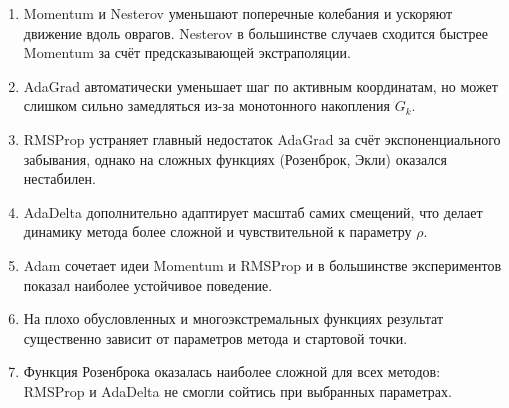 \documentclass[a4paper,12pt]{article}
\begin{document}
\begin{enumerate}

\item
Momentum и Nesterov уменьшают поперечные колебания
и ускоряют движение вдоль оврагов.
Nesterov в большинстве случаев сходится быстрее Momentum
за счёт предсказывающей экстраполяции.

\item
AdaGrad автоматически уменьшает шаг по активным координатам,
но может слишком сильно замедляться из-за монотонного
накопления $G_k$.

\item
RMSProp устраняет главный недостаток AdaGrad
за счёт экспоненциального забывания,
однако на сложных функциях (Розенброк, Экли)
оказался нестабилен.

\item
AdaDelta дополнительно адаптирует масштаб самих смещений,
что делает динамику метода более сложной
и чувствительной к параметру $\rho$.

\item
Adam сочетает идеи Momentum и RMSProp
и в большинстве экспериментов показал наиболее
устойчивое поведение.

\item
На плохо обусловленных и многоэкстремальных функциях
результат существенно зависит от параметров метода
и стартовой точки.

\item
Функция Розенброка оказалась наиболее сложной
для всех методов: RMSProp и AdaDelta не смогли сойтись
при выбранных параметрах.

\end{enumerate}
\end{document}
